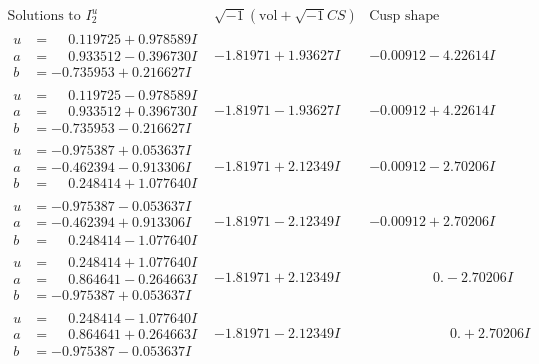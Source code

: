 \documentclass[1p]{elsarticle_modified}
\theoremstyle{definition}
\newcommand{\I}{\sqrt{-1}}
\begin{document}
$$\begin{array}{c|c|c}  
\text{Solutions to }I^u_{2}& \I (\text{vol} + \sqrt{-1}CS) & \text{Cusp shape}\\
 \hline 
\begin{aligned}
u &= \phantom{-}0.119725 + 0.978589 I \\
a &= \phantom{-}0.933512 - 0.396730 I \\
b &= -0.735953 + 0.216627 I\end{aligned}
 & -1.81971 + 1.93627 I & -0.00912 - 4.22614 I \\ \hline\begin{aligned}
u &= \phantom{-}0.119725 - 0.978589 I \\
a &= \phantom{-}0.933512 + 0.396730 I \\
b &= -0.735953 - 0.216627 I\end{aligned}
 & -1.81971 - 1.93627 I & -0.00912 + 4.22614 I \\ \hline\begin{aligned}
u &= -0.975387 + 0.053637 I \\
a &= -0.462394 - 0.913306 I \\
b &= \phantom{-}0.248414 + 1.077640 I\end{aligned}
 & -1.81971 + 2.12349 I & -0.00912 - 2.70206 I \\ \hline\begin{aligned}
u &= -0.975387 - 0.053637 I \\
a &= -0.462394 + 0.913306 I \\
b &= \phantom{-}0.248414 - 1.077640 I\end{aligned}
 & -1.81971 - 2.12349 I & -0.00912 + 2.70206 I \\ \hline\begin{aligned}
u &= \phantom{-}0.248414 + 1.077640 I \\
a &= \phantom{-}0.864641 - 0.264663 I \\
b &= -0.975387 + 0.053637 I\end{aligned}
 & -1.81971 + 2.12349 I & \phantom{-0.000000 } 0. - 2.70206 I \\ \hline\begin{aligned}
u &= \phantom{-}0.248414 - 1.077640 I \\
a &= \phantom{-}0.864641 + 0.264663 I \\
b &= -0.975387 - 0.053637 I\end{aligned}
 & -1.81971 - 2.12349 I & \phantom{-0.000000 -}0. + 2.70206 I \\ \hline\begin{aligned}

\end{aligned}
\end{array}$$
\end{document}
